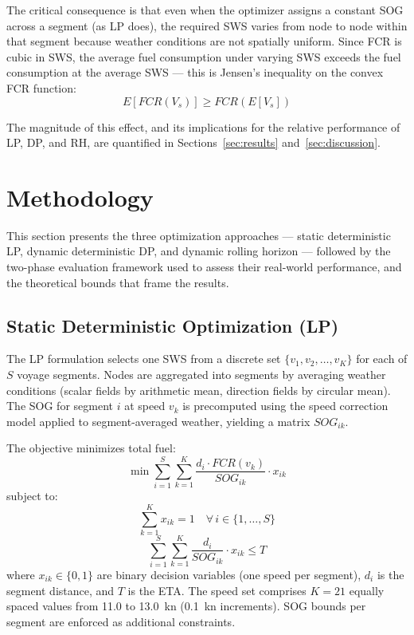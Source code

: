\documentclass[review]{elsarticle}
\begin{document}
The critical consequence is that even when the optimizer assigns a constant SOG across a segment (as LP does), the required SWS varies from node to node within that segment because weather conditions are not spatially uniform. Since FCR is cubic in SWS, the average fuel consumption under varying SWS exceeds the fuel consumption at the average SWS --- this is Jensen's inequality on the convex FCR function:
\begin{equation}
    E[FCR(V_s)] \geq FCR(E[V_s])
    \label{eq:jensen}
\end{equation}

The magnitude of this effect, and its implications for the relative performance of LP, DP, and RH, are quantified in Sections~\ref{sec:results} and~\ref{sec:discussion}.


\section{Methodology}
\label{sec:methodology}

This section presents the three optimization approaches --- static deterministic LP, dynamic deterministic DP, and dynamic rolling horizon --- followed by the two-phase evaluation framework used to assess their real-world performance, and the theoretical bounds that frame the results.

\subsection{Static Deterministic Optimization (LP)}
\label{sec:lp}

The LP formulation selects one SWS from a discrete set $\{v_1, v_2, \ldots, v_K\}$ for each of $S$ voyage segments. Nodes are aggregated into segments by averaging weather conditions (scalar fields by arithmetic mean, direction fields by circular mean). The SOG for segment $i$ at speed $v_k$ is precomputed using the speed correction model \cite{Yang2020} applied to segment-averaged weather, yielding a matrix $SOG_{ik}$.

The objective minimizes total fuel:
\begin{equation}
    \min \sum_{i=1}^{S} \sum_{k=1}^{K} \frac{d_i \cdot FCR(v_k)}{SOG_{ik}} \cdot x_{ik}
    \label{eq:lp-obj}
\end{equation}
subject to:
\begin{equation}
    \sum_{k=1}^{K} x_{ik} = 1 \quad \forall\, i \in \{1, \ldots, S\}
    \label{eq:lp-assign}
\end{equation}
\begin{equation}
    \sum_{i=1}^{S} \sum_{k=1}^{K} \frac{d_i}{SOG_{ik}} \cdot x_{ik} \leq T
    \label{eq:lp-eta}
\end{equation}
where $x_{ik} \in \{0, 1\}$ are binary decision variables (one speed per segment), $d_i$ is the segment distance, and $T$ is the ETA. The speed set comprises $K = 21$ equally spaced values from 11.0 to 13.0~kn (0.1~kn increments). SOG bounds per segment are enforced as additional constraints.
\end{document}
